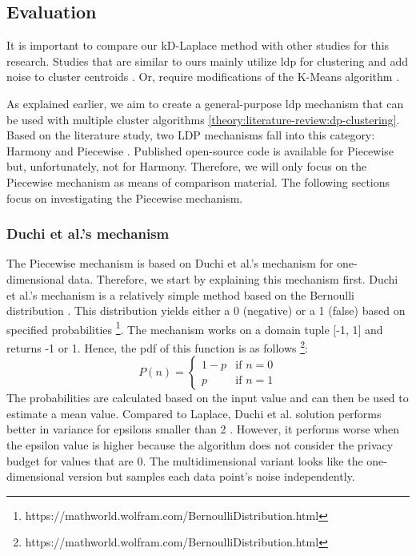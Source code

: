 \subsection{Evaluation}
It is important to compare our kD-Laplace method with other studies for this research.
Studies that are similar to ours mainly utilize \gls{ldp} for clustering and add noise to cluster centroids \citep{xia_distributed_2020, yuan_privacypreserving_2021, 9679364}.
Or, require modifications of the K-Means algorithm \citep{sun_distributed_2019}.

As explained earlier, we aim to create a general-purpose \gls{ldp} mechanism that can be used with multiple cluster algorithms \ref{theory:literature-review:dp-clustering}.
Based on the literature study, two LDP mechanisms fall into this category: Harmony and Piecewise \citep{nguyen_collecting_2016, wang_collecting_2019}.
Published open-source code is available for Piecewise but, unfortunately, not for Harmony.
Therefore, we will only focus on the Piecewise mechanism as means of comparison material.
The following sections focus on investigating the Piecewise mechanism.

\subsubsection{Duchi et al.'s mechanism}
The Piecewise mechanism is based on Duchi et al.'s mechanism for one-dimensional data.
Therefore, we start by explaining this mechanism first.
Duchi et al.'s mechanism is a relatively simple method based on the Bernoulli distribution \citep{duchi_minimax_2017}.
This distribution yields either a 0 (negative) or a 1 (false) based on specified probabilities \footnote{https://mathworld.wolfram.com/BernoulliDistribution.html}.
The mechanism works on a domain tuple [-1, 1] and returns -1 or 1.
Hence, the \gls{pdf} of this function is as follows \footnote{https://mathworld.wolfram.com/BernoulliDistribution.html}:
\begin{equation}
    P(n) =
    \begin{cases}
        1 - p & \text{if } n = 0 \\
        p     & \text{if } n = 1
    \end{cases}
\end{equation}
The probabilities are calculated based on the input value and can then be used to estimate a mean value.
Compared to Laplace, Duchi et al. solution performs better in variance for epsilons smaller than 2 \citep{wang_collecting_2019}.
However, it performs worse when the epsilon value is higher because the algorithm does not consider the privacy budget for values that are 0.
The multidimensional variant looks like the one-dimensional version but samples each data point's noise independently.

